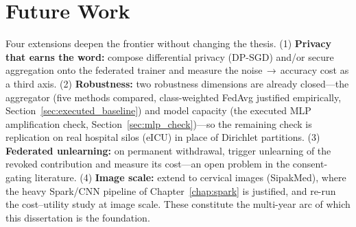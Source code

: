 \documentclass[12pt]{report}
\begin{document}
\section{Future Work}
Four extensions deepen the frontier without changing the thesis. (1)
\textbf{Privacy that earns the word:} compose differential privacy (DP-SGD) and/or
secure aggregation onto the federated trainer and measure the
noise\,$\rightarrow$\,accuracy cost as a third axis. (2) \textbf{Robustness:}
two robustness dimensions are already closed---the aggregator (five methods
compared, class-weighted FedAvg justified empirically,
Section~\ref{sec:executed_baseline}) and model capacity (the executed MLP
amplification check, Section~\ref{sec:mlp_check})---so the remaining check is
replication on real hospital silos (eICU) in place of Dirichlet partitions.
(3) \textbf{Federated unlearning:} on permanent withdrawal,
trigger unlearning of the revoked contribution and measure its cost---an open
problem in the consent-gating literature. (4) \textbf{Image scale:} extend to
cervical images (SipakMed), where the heavy Spark/CNN pipeline of
Chapter~\ref{chap:spark} is justified, and re-run the cost--utility study at image
scale. These constitute the multi-year arc of which this dissertation is the
foundation.

\printbibliography %
\end{document}
